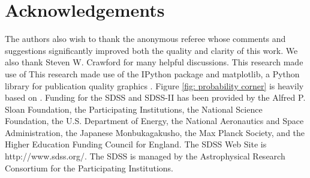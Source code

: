 \documentclass[fleqn,usenatbib]{mnras}
\begin{document}
\section*{Acknowledgements}
The authors also wish to thank the anonymous referee whose comments and suggestions significantly improved both the quality and clarity of this work. We also thank Steven W. Crawford for many helpful discussions. This research made use of This research made use of the {\sc IPython} package \citep{Perez2007} and {\sc matplotlib}, a Python library for publication quality graphics \citep{Hunter2007}. Figure \ref{fig: probability corner} is heavily based on \cite{Foreman-Mackey2016}. Funding for the SDSS and SDSS-II has been provided by the Alfred P. Sloan Foundation, the Participating Institutions, the National Science Foundation, the U.S. Department of Energy, the National Aeronautics and Space Administration, the Japanese Monbukagakusho, the Max Planck Society, and the Higher Education Funding Council for England. The SDSS Web Site is http://www.sdss.org/. The SDSS is managed by the Astrophysical Research Consortium for the Participating Institutions.



%
%

\bsp	%
\label{lastpage}
\end{document}
